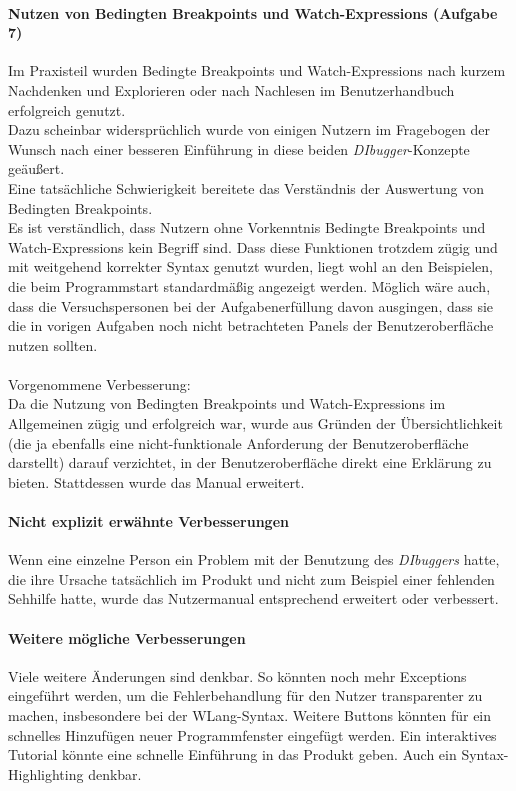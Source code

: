 \documentclass[parskip=full]{scrartcl}
\begin{document}
\paragraph{Nutzen von Bedingten Breakpoints und Watch-Expressions (Aufgabe 7)}
Im Praxisteil wurden Bedingte Breakpoints und Watch-Expressions nach kurzem Nachdenken und Explorieren oder nach Nachlesen im Benutzerhandbuch erfolgreich genutzt.\\
Dazu scheinbar widersprüchlich wurde von einigen Nutzern im Fragebogen der Wunsch nach einer besseren Einführung in diese beiden \textit{DIbugger}-Konzepte geäußert.\\
Eine tatsächliche Schwierigkeit bereitete das Verständnis der Auswertung von Bedingten Breakpoints.
\\
Es ist verständlich, dass Nutzern ohne Vorkenntnis Bedingte Breakpoints und Watch-Expressions kein Begriff sind. Dass diese Funktionen trotzdem zügig und mit weitgehend korrekter Syntax genutzt wurden, liegt wohl an den Beispielen, die beim Programmstart standardmäßig angezeigt werden. Möglich wäre auch, dass die Versuchspersonen bei der Aufgabenerfüllung davon ausgingen, dass sie die in vorigen Aufgaben noch nicht betrachteten Panels der Benutzeroberfläche nutzen sollten.\\\\
Vorgenommene Verbesserung:\\
Da die Nutzung von Bedingten Breakpoints und Watch-Expressions im Allgemeinen zügig und erfolgreich war, wurde aus Gründen der Übersichtlichkeit (die ja ebenfalls eine nicht-funktionale Anforderung der Benutzeroberfläche darstellt) darauf verzichtet, in der Benutzeroberfläche direkt eine Erklärung zu bieten. Stattdessen wurde das Manual erweitert.

\paragraph{Nicht explizit erwähnte Verbesserungen}
Wenn eine einzelne Person ein Problem mit der Benutzung des \textit{DIbuggers} hatte, die ihre Ursache tatsächlich im Produkt und nicht zum Beispiel einer fehlenden Sehhilfe hatte, wurde das Nutzermanual entsprechend erweitert oder verbessert.

\paragraph{Weitere mögliche Verbesserungen}
Viele weitere Änderungen sind denkbar. So könnten noch mehr Exceptions eingeführt werden, um die Fehlerbehandlung für den Nutzer transparenter zu machen, insbesondere bei der WLang-Syntax. Weitere Buttons könnten für ein schnelles Hinzufügen neuer Programmfenster eingefügt werden. Ein interaktives Tutorial könnte eine schnelle Einführung in das Produkt geben. Auch ein Syntax-Highlighting denkbar. 
\end{document}
